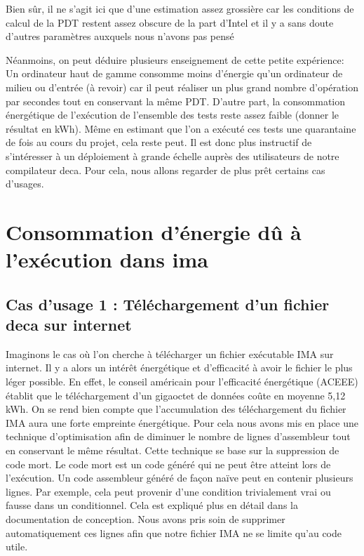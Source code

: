 \documentclass[12pt, a4paper, one side]{article}
\begin{document}
Bien sûr, il ne s'agit ici que d'une estimation assez grossière car les conditions de calcul de la PDT restent assez obscure de la part d'Intel et il y a sans doute d'autres paramètres auxquels nous n'avons pas pensé

Néanmoins, on peut déduire plusieurs enseignement de cette petite expérience:
Un ordinateur haut de gamme consomme moins d'énergie qu'un ordinateur de milieu ou d'entrée (à revoir) car il peut réaliser un plus grand nombre d'opération par secondes tout en conservant la même PDT.
D'autre part, la consommation énergétique de l’exécution de l'ensemble des tests reste assez faible (donner le résultat en kWh). Même en estimant que l'on a exécuté ces tests une quarantaine de fois au cours du projet, cela reste peut.
Il est donc plus instructif de s'intéresser à un déploiement à grande échelle auprès des utilisateurs de notre compilateur deca. Pour cela, nous allons regarder de plus prêt certains cas d'usages.



\section{Consommation d'énergie dû à l'exécution dans ima}

\subsection{Cas d'usage 1 : Téléchargement d'un fichier deca sur internet}

Imaginons le cas où l'on cherche à télécharger un fichier exécutable IMA sur internet. Il y a alors un intérêt énergétique et d'efficacité à avoir le fichier le plus léger possible. En effet, le conseil américain pour l’efficacité énergétique (ACEEE) établit que le téléchargement d'un gigaoctet de données coûte en moyenne 5,12 kWh. On se rend bien compte que l'accumulation des téléchargement du fichier IMA aura une forte empreinte énergétique. Pour cela nous avons mis en place une technique d'optimisation afin de diminuer le nombre de lignes d'assembleur tout en conservant le même résultat. Cette technique se base sur la suppression de code mort. Le code mort est un code généré qui ne peut être atteint lors de l'exécution. Un code assembleur généré de façon naïve peut en contenir plusieurs lignes. Par exemple, cela peut provenir d'une condition trivialement vrai ou fausse dans un conditionnel. Cela est expliqué plus en détail dans la documentation de conception.
Nous avons pris soin de supprimer automatiquement ces lignes afin que notre fichier IMA ne se limite qu'au code utile. 
\end{document}
